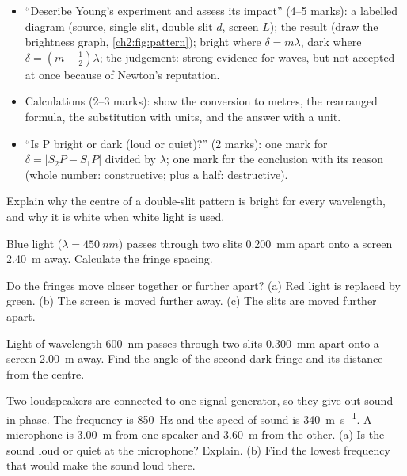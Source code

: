 \begin{examtip}
\begin{itemize}
  \item ``Describe Young's experiment and assess its impact'' (4--5 marks): a labelled
        diagram (source, single slit, double slit $d$, screen $L$); the result (draw the
        brightness graph, \cref{ch2:fig:pattern}); bright where $\delta = m\lambda$, dark where
        $\delta = \left(m - \frac{1}{2}\right)\lambda$; the judgement: strong evidence for
        waves, but not accepted at once because of Newton's reputation.
  \item Calculations (2--3 marks): show the conversion to metres, the rearranged formula,
        the substitution with units, and the answer with a unit.
  \item ``Is P bright or dark (loud or quiet)?'' (2 marks): one mark for
        $\delta = \left|S_2P - S_1P\right|$ divided by $\lambda$; one mark for the conclusion
        with its reason (whole number: constructive; plus a half: destructive).
\end{itemize}
\end{examtip}

\begin{quickcheck}
  \item Explain why the centre of a double-slit pattern is bright for every wavelength,
        and why it is white when white light is used.
  \item Blue light ($\lambda = \qty{450}{nm}$) passes through two slits \qty{0.200}{mm}
        apart onto a screen \qty{2.40}{m} away. Calculate the fringe spacing.
  \item Do the fringes move closer together or further apart? (a) Red light is replaced
        by green. (b) The screen is moved further away. (c) The slits are moved further
        apart.
  \item Light of wavelength \qty{600}{nm} passes through two slits \qty{0.300}{mm} apart
        onto a screen \qty{2.00}{m} away. Find the angle of the second dark fringe and its
        distance from the centre.
  \item Two loudspeakers are connected to one signal generator, so they give out sound in
        phase. The frequency is \qty{850}{Hz} and the speed of sound is \qty{340}{m.s^{-1}}.
        A microphone is \qty{3.00}{m} from one speaker and \qty{3.60}{m} from the other.
        (a) Is the sound loud or quiet at the microphone? Explain. (b) Find the lowest
        frequency that would make the sound loud there.\label{ch2:qc:speakers}
\end{quickcheck}

